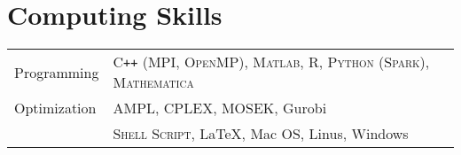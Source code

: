 \documentclass[a4paper,11pt]{article} %
\newcommand{\lst}[1]{\quad\footnotesize{$\blacktriangleright$ #1.}}
\begin{document}
\section{Computing Skills}
\begin{longtable}{>{\centering}p{3.3cm}|p{14cm}}
    Programming & \textsc{C\texttt{++} (MPI, OpenMP)}, \textsc{Matlab}, \textsc{R}, \textsc{Python (Spark)}, \textsc{Mathematica}\\
    Optimization & AMPL, CPLEX, MOSEK, Gurobi \\
    {Others} &  \textsc{Shell Script}, \LaTeX, Mac OS, Linus, Windows
\end{longtable}

\end{document}
